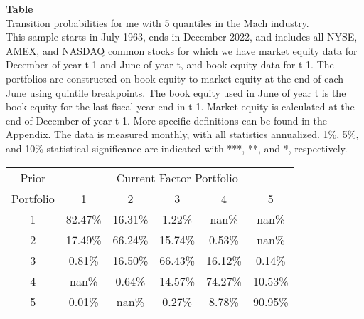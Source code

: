 \begin{table*}[ht!]
\raggedright
{}
\label{tab: transition_probs_me_Mach_with_5_quantiles}
\textbf{Table \thetable} \\
Transition probabilities for me with 5 quantiles in the Mach industry. \\
\hspace*{1em}This sample starts in July 1963, ends in December 2022, and includes all NYSE, AMEX, and NASDAQ common stocks for which we have market equity data for December of year t-1 and June of year t, and book equity data for t-1. The portfolios are constructed on book equity to market equity at the end of each June using quintile breakpoints.  The book equity used in June of year t is the book equity for the last fiscal year end in t-1.  Market equity is calculated at the end of December of year t-1.  More specific definitions can be found in the Appendix.  The data is measured monthly, with all statistics annualized.  1\%, 5\%, and 10\% statistical significance are indicated with ***, **, and *, respectively. \\
\vspace{0.5em}
\centering
\begin{adjustbox}{max width=\textwidth}
\begin{tabular}{@{}cccccc@{}}
\toprule
Prior & \multicolumn{5}{c}{Current Factor Portfolio} \\
Portfolio & 1 & 2 & 3 & 4 & 5 \\
\midrule
1 & 82.47\% & 16.31\% & 1.22\% & nan\% & nan\% \\
2 & 17.49\% & 66.24\% & 15.74\% & 0.53\% & nan\% \\
3 & 0.81\% & 16.50\% & 66.43\% & 16.12\% & 0.14\% \\
4 & nan\% & 0.64\% & 14.57\% & 74.27\% & 10.53\% \\
5 & 0.01\% & nan\% & 0.27\% & 8.78\% & 90.95\% \\
\bottomrule
\end{tabular}
\end{adjustbox}
\end{table*}